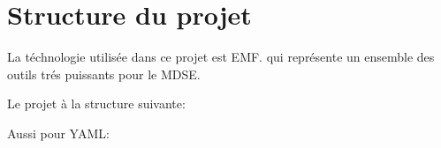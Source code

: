 \section{Structure du projet}

La téchnologie utilisée dans ce projet est EMF. qui représente un
ensemble des outils trés puissants pour le MDSE.

Le projet à la structure suivante:

\begin{figure}[H]
  \begin{center}
      \caption{}
  \end{center}
\end{figure}

Aussi pour YAML:

\begin{figure}[H]
  \begin{center}
      \caption{}
  \end{center}
\end{figure}

